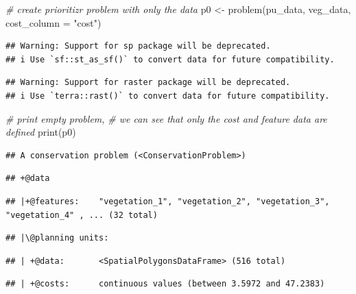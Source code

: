 \documentclass[
  12pt,
]{book}
\newenvironment{Shaded}{\begin{snugshade}}{\end{snugshade}}
\newcommand{\AttributeTok}[1]{\textcolor[rgb]{0.77,0.63,0.00}{#1}}
\newcommand{\CommentTok}[1]{\textcolor[rgb]{0.56,0.35,0.01}{\textit{#1}}}
\newcommand{\FunctionTok}[1]{\textcolor[rgb]{0.00,0.00,0.00}{#1}}
\newcommand{\NormalTok}[1]{#1}
\newcommand{\OtherTok}[1]{\textcolor[rgb]{0.56,0.35,0.01}{#1}}
\newcommand{\StringTok}[1]{\textcolor[rgb]{0.31,0.60,0.02}{#1}}
\begin{document}
\begin{Shaded}
\begin{Highlighting}[]
\CommentTok{\# create prioritizr problem with only the data}
\NormalTok{p0 }\OtherTok{\textless{}{-}} \FunctionTok{problem}\NormalTok{(pu\_data, veg\_data, }\AttributeTok{cost\_column =} \StringTok{"cost"}\NormalTok{)}
\end{Highlighting}
\end{Shaded}

\begin{verbatim}
## Warning: Support for sp package will be deprecated.
## i Use `sf::st_as_sf()` to convert data for future compatibility.
\end{verbatim}

\begin{verbatim}
## Warning: Support for raster package will be deprecated.
## i Use `terra::rast()` to convert data for future compatibility.
\end{verbatim}

\begin{Shaded}
\begin{Highlighting}[]
\CommentTok{\# print empty problem,}
\CommentTok{\# we can see that only the cost and feature data are defined}
\FunctionTok{print}\NormalTok{(p0)}
\end{Highlighting}
\end{Shaded}

\begin{verbatim}
## A conservation problem (<ConservationProblem>)
\end{verbatim}

\begin{verbatim}
## +@data
\end{verbatim}

\begin{verbatim}
## |+@features:    "vegetation_1", "vegetation_2", "vegetation_3", "vegetation_4" , ... (32 total)
\end{verbatim}

\begin{verbatim}
## |\@planning units:
\end{verbatim}

\begin{verbatim}
## | +@data:       <SpatialPolygonsDataFrame> (516 total)
\end{verbatim}

\begin{verbatim}
## | +@costs:      continuous values (between 3.5972 and 47.2383)
\end{verbatim}
\end{document}
